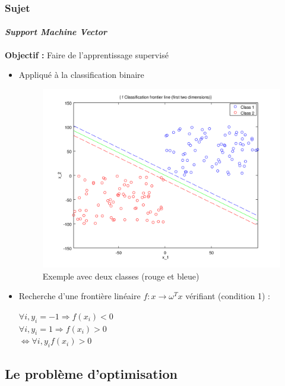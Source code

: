 \documentclass{beamer}
\begin{document}
\begin{frame}
\frametitle{Sujet}
\framesubtitle{\emph{Support Machine Vector}}

\begin{center}
\textbf{Objectif :} Faire de l'apprentissage supervisé
\end{center}

\begin{itemize}
\item Appliqué à la classification binaire

         \begin{figure}
         \centering
         \caption{Exemple avec deux classes (rouge et bleue)}
         \includegraphics[scale=0.3]{images/voronoi.png}
         \end{figure}

\item Recherche d'une frontière linéaire $f : x \rightarrow \omega^Tx$ vérifiant (condition 1) :

         \begin{center}
         $\forall i, y_i = -1 \Rightarrow f(x_i) < 0$\\
         $\forall i, y_i = 1 \Rightarrow f(x_i) > 0$\\
         $\Leftrightarrow \forall i, y_i f(x_i) > 0$
         \end{center}
\end{itemize}

\end{frame}

\subsection{Le problème d'optimisation}
\end{document}

